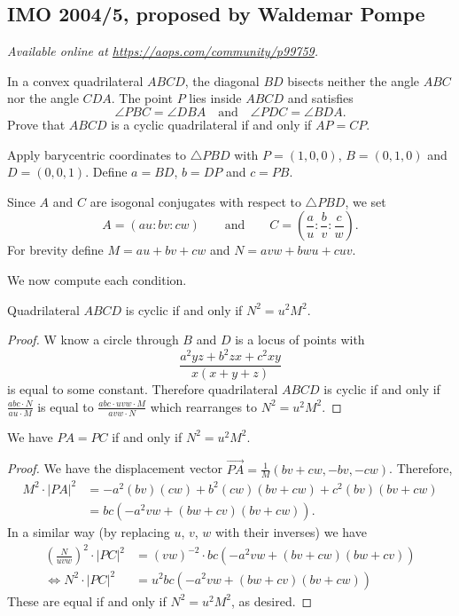 \documentclass[11pt]{scrartcl}
\begin{document}
\subsection{IMO 2004/5, proposed by Waldemar Pompe}
\textsl{Available online at \url{https://aops.com/community/p99759}.}
\begin{mdframed}[style=mdpurplebox,frametitle={Problem statement}]
In a convex quadrilateral $ABCD$,
the diagonal $BD$ bisects neither the angle $ABC$ nor the angle $CDA$.
The point $P$ lies inside $ABCD$ and satisfies
\[\angle PBC=\angle DBA \quad\text{and}\quad \angle PDC=\angle BDA. \]
Prove that $ABCD$ is a cyclic quadrilateral
if and only if $AP=CP$.
\end{mdframed}
Apply barycentric coordinates to $\triangle PBD$
with $P = (1,0,0)$, $B = (0,1,0)$ and $D = (0,0,1)$.
Define $a = BD$, $b = DP$ and $c = PB$.

Since $A$ and $C$ are isogonal conjugates with respect to $\triangle PBD$,
we set \[ A = (au : bv : cw) \qquad\text{and}\qquad
  C = \left( \frac au : \frac bv : \frac cw \right). \]
For brevity define $M = au + bv + cw$ and $N = avw + bwu + cuv$.

We now compute each condition.
\begin{claim*}
  Quadrilateral $ABCD$ is cyclic if and only if $N^2 = u^2 M^2$.
\end{claim*}
\begin{proof}
  W know a circle through $B$ and $D$
  is a locus of points
  with \[ \frac{a^2yz+b^2zx+c^2xy}{x(x+y+z)} \]
  is equal to some constant.
  Therefore quadrilateral $ABCD$ is cyclic if and only if
  $\frac{abc \cdot N}{au \cdot M}$
  is equal to $\frac{abc \cdot uvw \cdot M}{avw \cdot N}$
  which rearranges to $N^2 = u^2M^2$.
\end{proof}
\begin{claim*}
  We have $PA = PC$ if and only if $N^2 = u^2 M^2$.
\end{claim*}
\begin{proof}
  We have the displacement vector
  $\overrightarrow{PA}
  = \tfrac{1}{M} \left( bv+cw , -bv ,-cw \right)$.
  Therefore,
  \begin{align*}
    M^2 \cdot \left\lvert PA \right\rvert^2
    &= -a^2(bv)(cw) + b^2(cw)(bv+cw) + c^2(bv)(bv+cw) \\
    &= bc(-a^2vw + (bw+cv)(bv+cw)).
  \end{align*}
  In a similar way
  (by replacing $u$, $v$, $w$ with their inverses)
  we have
  \begin{align*}
    \left( \frac{N}{uvw} \right)^2 \cdot \left\lvert PC \right\rvert^2
    &= (vw)^{-2} \cdot bc(-a^2vw + (bv+cw)(bw+cv)) \\
    \iff N^2 \cdot \left\lvert PC \right\rvert^2
    & = u^2 bc(-a^2vw + (bw+cv)(bv+cw))
  \end{align*}
  These are equal if and only if $N^2 = u^2M^2$, as desired.
\end{proof}
\pagebreak
\end{document}
